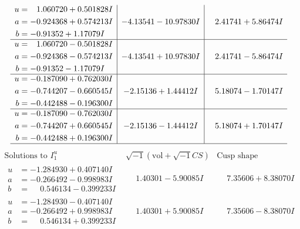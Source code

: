 \documentclass[1p]{elsarticle_modified}
\theoremstyle{definition}
\newcommand{\I}{\sqrt{-1}}
\begin{document}
$$\begin{array}{c|c|c}
\begin{aligned}
u &= \phantom{-}1.060720 + 0.501828 I \\
a &= -0.924368 + 0.574213 I \\
b &= -0.91352 + 1.17079 I\end{aligned}
 & -4.13541 - 10.97830 I & \phantom{-}2.41741 + 5.86474 I \\ \hline\begin{aligned}
u &= \phantom{-}1.060720 - 0.501828 I \\
a &= -0.924368 - 0.574213 I \\
b &= -0.91352 - 1.17079 I\end{aligned}
 & -4.13541 + 10.97830 I & \phantom{-}2.41741 - 5.86474 I \\ \hline\begin{aligned}
u &= -0.187090 + 0.762030 I \\
a &= -0.744207 - 0.660545 I \\
b &= -0.442488 - 0.196300 I\end{aligned}
 & -2.15136 + 1.44412 I & \phantom{-}5.18074 - 1.70147 I \\ \hline\begin{aligned}
u &= -0.187090 - 0.762030 I \\
a &= -0.744207 + 0.660545 I \\
b &= -0.442488 + 0.196300 I\end{aligned}
 & -2.15136 - 1.44412 I & \phantom{-}5.18074 + 1.70147 I\\
 \hline 
 \end{array}$$\newpage$$\begin{array}{c|c|c}  
\text{Solutions to }I^u_{1}& \I (\text{vol} + \sqrt{-1}CS) & \text{Cusp shape}\\
 \hline 
\begin{aligned}
u &= -1.284930 + 0.407140 I \\
a &= -0.266492 - 0.998983 I \\
b &= \phantom{-}0.546134 - 0.399233 I\end{aligned}
 & \phantom{-}1.40301 - 5.90085 I & \phantom{-}7.35606 + 8.38070 I \\ \hline\begin{aligned}
u &= -1.284930 - 0.407140 I \\
a &= -0.266492 + 0.998983 I \\
b &= \phantom{-}0.546134 + 0.399233 I\end{aligned}
 & \phantom{-}1.40301 + 5.90085 I & \phantom{-}7.35606 - 8.38070 I \\ \hline\begin{aligned}

\end{aligned}
\end{array}$$
\end{document}
